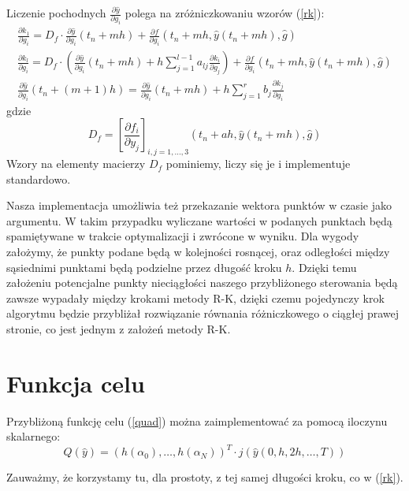\documentclass[licencjacka]{pracamgr}
\begin{document}
Liczenie pochodnych $\frac{\partial \hat{y}}{\partial g_i}$ polega na zróżniczkowaniu wzorów (\ref{rk}):
\begin{gather}
    \frac{\partial k_1}{\partial g_i} = D_f \cdot \frac{\partial \hat{y}}{\partial g_i}(t_n + mh) + \frac{\partial f}{\partial g_i}(t_n + mh, \hat{y}(t_n + mh), \hat{g}) \nonumber \\
    \frac{\partial k_l}{\partial g_i}  = D_f \cdot \left(\frac{\partial \hat{y}}{\partial g_i}(t_n + mh) + h\sum_{j=1}^{l-1} a_{lj}\frac{\partial k_i}{\partial g_j} \right) + \frac{\partial f}{\partial g_i}(t_n + mh, \hat{y}(t_n + mh), \hat{g})  \label{drk}\\
    \frac{\partial \hat{y}}{\partial g_i}(t_n + (m+1)h) = \frac{\partial \hat{y}}{\partial g_i}(t_n + mh) + h\sum_{j=1}^r b_j \frac{\partial k_j}{\partial g_i} \nonumber
\end{gather}
gdzie
\begin{equation} \label{Df}
  D_f = {\left[\frac{\partial f_i}{\partial y_j}\right]}_{i,j = 1,\ldots, 3} (t_n + ah, \hat{y}(t_n + mh), \hat{g})
\end{equation}
Wzory na elementy macierzy $D_f$ pominiemy, liczy się je i implementuje standardowo.

Nasza implementacja umożliwia też przekazanie wektora punktów w czasie jako argumentu. W takim przypadku wyliczane wartości w podanych punktach będą spamiętywane w trakcie optymalizacji i zwrócone w wyniku. Dla wygody założymy, że punkty podane będą w kolejności rosnącej, oraz odległości między sąsiednimi punktami będą podzielne przez długość kroku $h$. Dzięki temu założeniu potencjalne punkty nieciągłości naszego przybliżonego sterowania będą zawsze wypadały między krokami metody R-K, dzięki czemu pojedynczy krok algorytmu będzie przybliżał rozwiązanie równania różniczkowego o ciągłej prawej stronie, co jest jednym z założeń metody R-K.

\section{Funkcja celu}
Przybliżoną funkcję celu (\ref{quad}) można zaimplementować za pomocą iloczynu skalarnego:
\begin{equation}
  Q(\hat{y}) = {\left(h(\alpha_0),\ldots,h(\alpha_N)\right)}^T \cdot {j(\hat{y}(0, h, 2h, \ldots, T))}
\end{equation}

Zauważmy, że korzystamy tu, dla prostoty, z tej samej długości kroku, co w (\ref{rk}).
\end{document}
